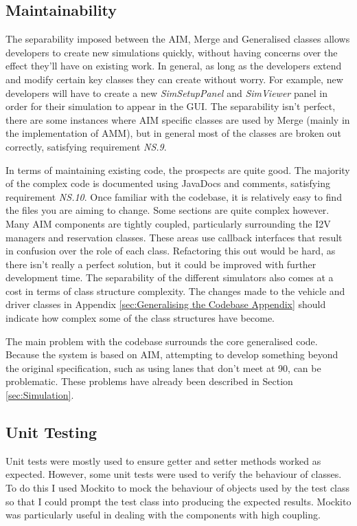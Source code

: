 \subsection{Maintainability}
\label{subsec:Maintainability}
The separability imposed between the AIM, Merge and Generalised classes allows developers to create new simulations quickly, without having concerns over the effect they'll have on existing work. In general, as long as the developers extend and modify certain key classes they can create without worry. For example, new developers will have to create a new \emph{SimSetupPanel} and \emph{SimViewer} panel in order for their simulation to appear in the GUI. The separability isn't perfect, there are some instances where AIM specific classes are used by Merge (mainly in the implementation of AMM), but in general most of the classes are broken out correctly, satisfying requirement \emph{NS.9}.

In terms of maintaining existing code, the prospects are quite good. The  majority of the complex code is documented using JavaDocs and comments, satisfying requirement \emph{NS.10}. Once familiar with the codebase, it is relatively easy to find the files you are aiming to change. Some sections are quite complex however. Many AIM components are tightly coupled, particularly surrounding the I2V managers and reservation classes. These areas use callback interfaces that result in confusion over the role of each class. Refactoring this out would be hard, as there isn't really a perfect solution, but it could be improved with further development time. The separability of the different simulators also comes at a cost in terms of class structure complexity. The changes made to the vehicle and driver classes in Appendix \ref{sec:Generalising the Codebase Appendix} should indicate how complex some of the class structures have become.

The main problem with the codebase surrounds the core generalised code. Because the system is based on AIM, attempting to develop something beyond the original specification, such as using lanes that don't meet at 90\degree, can be problematic. These problems have already been described in Section \ref{sec:Simulation}.

\subsection{Unit Testing}
\label{subsec:Unit Testing}
Unit tests were mostly used to ensure getter and setter methods worked as expected. However, some unit tests were used to verify the behaviour of classes. To do this I used Mockito \citep{MockitoWebsite} to mock the behaviour of objects used by the test class so that I could prompt the test class into producing the expected results. Mockito was particularly useful in dealing with the components with high coupling.

